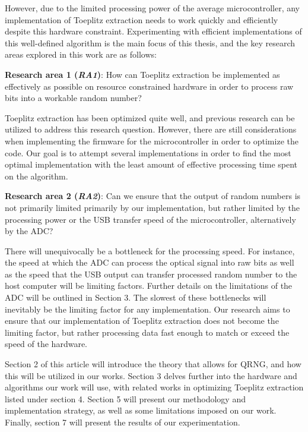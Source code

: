 \documentclass{sigchi}
\begin{document}
However, due to the limited processing power of the average microcontroller, any implementation of Toeplitz extraction needs to work quickly and efficiently despite this hardware constraint. Experimenting with efficient implementations of this well-defined algorithm is the main focus of this thesis, and the key research areas explored in this work are as follows:

\textbf{Research area 1 (\emph{RA1})}: How can Toeplitz extraction be implemented as effectively as possible on resource constrained hardware in order to process raw bits into a workable random number?

Toeplitz extraction has been optimized quite well, and previous research can be utilized to address this research question. However, there are still considerations when implementing the firmware for the microcontroller in order to optimize the code. Our goal is to attempt several implementations in order to find the most optimal implementation with the least amount of effective processing time spent on the algorithm.

\textbf{Research area 2 (\emph{RA2})}: Can we ensure that the output of random numbers is not primarily limited primarily by our implementation, but rather limited by the processing power or the USB transfer speed of the microcontroller, alternatively by the ADC?

There will unequivocally be a bottleneck for the processing speed. For instance, the speed at which the ADC can process the optical signal into raw bits as well as the speed that the USB output can transfer processed random number to the host computer will be limiting factors. Further details on the limitations of the ADC will be outlined in Section 3. The slowest of these bottlenecks will inevitably be the limiting factor for any implementation. Our research aims to ensure that our implementation of Toeplitz extraction does not become the limiting factor, but rather processing data fast enough to match or exceed the speed of the hardware.

Section 2 of this article will introduce the theory that allows for QRNG, and how this will be utilized in our works. Section 3 delves further into the hardware and algorithms our work will use, with related works in optimizing Toeplitz extraction listed under section 4. Section 5 will present our methodology and implementation strategy, as well as some limitations imposed on our work. Finally, section 7 will present the results of our experimentation.
\end{document}

